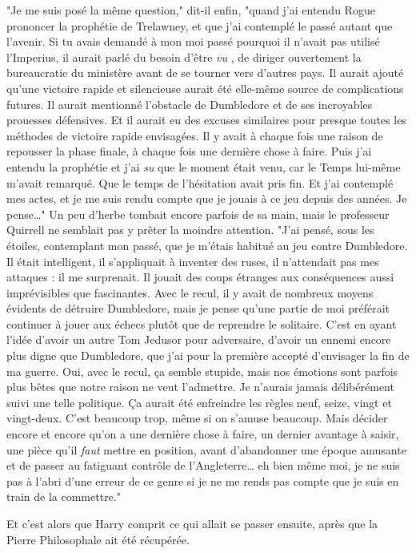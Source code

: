 "Je me suis posé la même question," dit-il enfin, "quand j'ai entendu Rogue prononcer la prophétie de Trelawney, et que j'ai contemplé le passé autant que l'avenir. Si tu avais demandé à mon moi passé pourquoi il n'avait pas utilisé l'Imperius, il aurait parlé du besoin d'être \emph{vu} , de diriger ouvertement la bureaucratie du ministère avant de se tourner vers d'autres pays. Il aurait ajouté qu'une victoire rapide et silencieuse aurait été elle-même source de complications futures. Il aurait mentionné l'obstacle de Dumbledore et de ses incroyables prouesses défensives. Et il aurait eu des excuses similaires pour presque toutes les méthodes de victoire rapide envisagées. Il y avait à chaque fois une raison de repousser la phase finale, à chaque fois une dernière chose à faire. Puis j'ai entendu la prophétie et j'ai \emph{su}  que le moment était venu, car le Temps lui-même m'avait remarqué. Que le temps de l'hésitation avait pris fin. Et j'ai contemplé mes actes, et je me suis rendu compte que je jouais à ce jeu depuis des années. Je pense…" Un peu d'herbe tombait encore parfois de sa main, mais le professeur Quirrell ne semblait pas y prêter la moindre attention. "J'ai pensé, sous les étoiles, contemplant mon passé, que je m'étais habitué au jeu contre Dumbledore. Il était intelligent, il s'appliquait à inventer des ruses, il n'attendait pas mes attaques : il me surprenait. Il jouait des coups étranges aux conséquences aussi imprévisibles que fascinantes. Avec le recul, il y avait de nombreux moyens évidents de détruire Dumbledore, mais je pense qu'une partie de moi préférait continuer à jouer aux échecs plutôt que de reprendre le solitaire. C'est en ayant l'idée d'avoir un autre Tom Jedusor pour adversaire, d'avoir un ennemi encore plus digne que Dumbledore, que j'ai pour la première accepté d'envisager la fin de ma guerre. Oui, avec le recul, ça semble stupide, mais nos émotions sont parfois plus bêtes que notre raison ne veut l'admettre. Je n'aurais jamais délibérément suivi une telle politique. Ça aurait été enfreindre les règles neuf, seize, vingt et vingt-deux. C'est beaucoup trop, même si on s'amuse beaucoup. Mais décider encore et encore qu'on a une dernière chose à faire, un dernier avantage à saisir, une pièce qu'il \emph{faut}  mettre en position, avant d'abandonner une époque amusante et de passer au fatiguant contrôle de l'Angleterre… eh bien même moi, je ne suis pas à l'abri d'une erreur de ce genre si je ne me rends pas compte que je suis en train de la commettre."

Et c'est alors que Harry comprit ce qui allait se passer ensuite, après que la Pierre Philosophale ait été récupérée.

